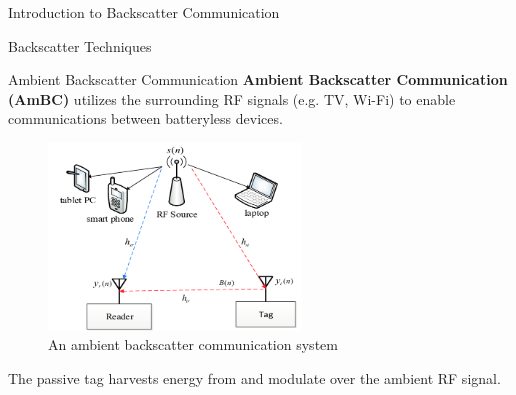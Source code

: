 \documentclass[9pt]{beamer}
\begin{document}
\begin{section}{Introduction to Backscatter Communication}
		\begin{subsection}{Backscatter Techniques}
			\begin{frame}{Ambient Backscatter Communication}
				\textbf{Ambient Backscatter Communication (AmBC)} utilizes the surrounding RF signals (e.g. TV, Wi-Fi) to enable communications between batteryless devices.

				\begin{figure}
					\centering
					\includegraphics[width=0.6\textwidth]{assets/ambient_backscatter_system.png}
					\caption{An ambient backscatter communication system \cite{Zhao2017}}
					\label{fi:ambient_backscatter}
				\end{figure}

				The passive tag harvests energy from and modulate over the ambient RF signal.
			\end{frame}


\end{subsection}
\end{section}
\end{document}
